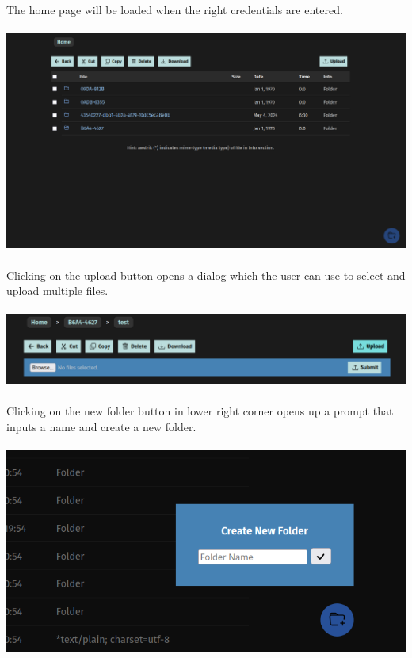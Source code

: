 \documentclass[12pt]{article}
\begin{document}
The home page will be loaded when the right credentials are entered. \\ \\
\includegraphics[width=\linewidth]{ss/2.cm-home.png} \\ \\

\clearpage
Clicking on the upload button opens a dialog which the user can use to select and upload multiple files. \\ \\
\includegraphics[width=\linewidth]{ss/3.cm-upload.png} \\ \\

Clicking on the new folder button in lower right corner opens up a prompt that inputs a name and create a new folder. \\ \\
\includegraphics[width=\linewidth]{ss/4.cm-create-folder.png} \\ \\
\end{document}
